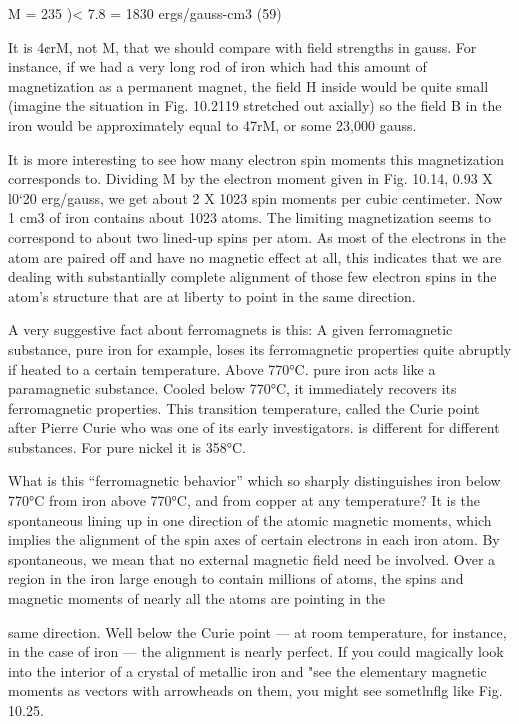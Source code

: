 M = 235 )< 7.8 = 1830 ergs/gauss-cm3 (59)

It is 4¢rM, not M, that we should compare with field strengths in gauss.
For instance, if we had a very long rod of iron which had this amount
of magnetization as a permanent magnet, the field H inside would
be quite small (imagine the situation in Fig. 10.2119 stretched out
axially) so the field B in the iron would be approximately equal to
47rM, or some 23,000 gauss.

It is more interesting to see how many electron spin moments this
magnetization corresponds to. Dividing M by the electron moment
given in Fig. 10.14, 0.93 X l0‘20 erg/gauss, we get about 2 X 1023
spin moments per cubic centimeter. Now 1 cm3 of iron contains
about 1023 atoms. The limiting magnetization seems to correspond
to about two lined-up spins per atom. As most of the electrons in
the atom are paired off and have no magnetic effect at all, this indicates
that we are dealing with substantially complete alignment
of those few electron spins in the atom's structure that are at liberty
to point in the same direction.

A very suggestive fact about ferromagnets is this: A given ferromagnetic
substance, pure iron for example, loses its ferromagnetic
properties quite abruptly if heated to a certain temperature. Above
770°C. pure iron acts like a paramagnetic substance. Cooled below
770°C, it immediately recovers its ferromagnetic properties. This
transition temperature, called the Curie point after Pierre Curie who
was one of its early investigators. is different for different substances.
For pure nickel it is 358°C.

What is this ``ferromagnetic behavior'' which so sharply distinguishes
iron below 770°C from iron above 770°C, and from copper
at any temperature? It is the spontaneous lining up in one direction
of the atomic magnetic moments, which implies the alignment of
the spin axes of certain electrons in each iron atom. By spontaneous,
we mean that no external magnetic field need be involved. Over a
region in the iron large enough to contain millions of atoms, the spins
and magnetic moments of nearly all the atoms are pointing in the

 

same direction. Well below the Curie point --- at room temperature,
for instance, in the case of iron --- the alignment is nearly perfect.
If you could magically look into the interior of a crystal of metallic
iron and "see the elementary magnetic moments as vectors with
arrowheads on them, you might see sometlnflg like Fig. 10.25.

